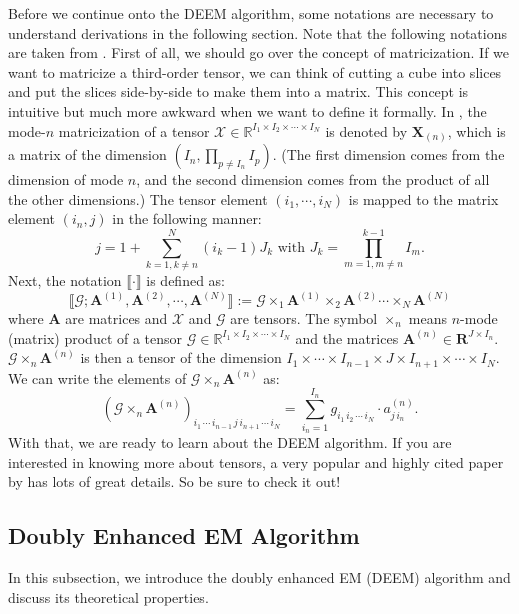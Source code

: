 \documentclass[11pt]{article}
\begin{document}
Before we continue onto the DEEM algorithm, some notations are necessary to understand derivations in the following section. Note that the following notations are taken from \cite{kolda2009review}. First of all, we should go over the concept of matricization. If we want to matricize a third-order tensor, we can think of cutting a cube into slices and put the slices side-by-side to make them into a matrix. This concept is intuitive but much more awkward when we want to define it formally. In \cite{kolda2009review}, the mode-$n$ matricization of a tensor $\mathcal{X} \in \mathbb{R}^{I_1 \times I_2 \times \cdots \times I_N}$ is denoted by $\mathbf{X}_{(n)}$, which is a matrix of the dimension $(I_n, \prod_{p \ne I_n} I_p)$. (The first dimension comes from the dimension of mode $n$, and the second dimension comes from the product of all the other dimensions.) The tensor element $(i_1, \cdots, i_N)$ is mapped to the matrix element $(i_n, j)$ in the following manner: 
\[ 
    j = 1 + \sum_{k=1,k\ne n}^N (i_k - 1) J_k \text{ with } J_k = \prod_{m=1,m \ne n}^{k-1} I_m.
\]
Next, the notation $\llbracket \cdot \rrbracket$ is defined as: 
\[
    \llbracket \mathcal{G}; \mathbf{A}^{(1)}, \mathbf{A}^{(2)}, \cdots, \mathbf{A}^{(N)} \rrbracket := \mathcal{G} \times_1 \mathbf{A}^{(1)} \times_2 \mathbf{A}^{(2)} 
    \cdots 
    \times_N \mathbf{A}^{(N)}
\]
where $\mathbf{A}$ are matrices and $\mathcal{X}$ and $\mathcal{G}$ are tensors. The symbol $\times_n$ means $n$-mode (matrix) product of a tensor $\mathcal{G} \in \mathbb{R}^{I_1 \times I_2 \times \cdots \times I_N}$ and the matrices $\mathbf{A}^{(n)} \in \mathbf{R}^{J \times I_n}$. $\mathcal{G} \times_n \mathbf{A}^{(n)}$ is then a tensor of the dimension $I_1 \times \cdots \times I_{n-1} \times J \times I_{n+1} \times \cdots \times I_N$. We can write the elements of $\mathcal{G} \times_n \mathbf{A}^{(n)}$ as:
\[
    (\mathcal{G} \times_n \mathbf{A}^{(n)})_{i_1 \, \cdots \, i_{n-1} \, j  \, i_{n+1} \, \cdots \, i_N} = \sum_{i_n = 1}^{I_n} g_{i_1 \, i_2 \, \cdots \, i_N} \cdot a^{(n)}_{j\, i_n}.  
\]
With that, we are ready to learn about the DEEM algorithm. If you are interested in knowing more about tensors, a very popular and highly cited paper by \cite{kolda2009review} has lots of great details. So be sure to check it out! 

\subsection{Doubly Enhanced EM Algorithm}
In this subsection, we introduce the doubly enhanced EM (DEEM) algorithm and discuss its theoretical properties.
\end{document}
